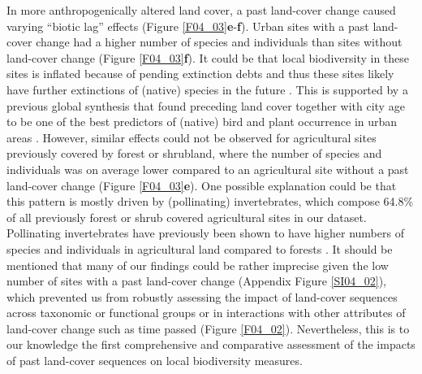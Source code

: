 In more anthropogenically altered land cover, a past land-cover change caused varying “biotic lag” effects (Figure \ref{F04_03}\textbf{e}-\textbf{f}). Urban sites with a past land-cover change had a higher number of species and individuals than sites without land-cover change (Figure \ref{F04_03}\textbf{f}). It could be that local biodiversity in these sites is inflated because of pending extinction debts and thus these sites likely have further extinctions of (native) species in the future \citep{Tilman1994,Kuussaari2009,Hylander2013}. This is supported by a previous global synthesis that found preceding land cover together with city age to be one of the best predictors of (native) bird and plant occurrence in urban areas \citep{Aronson2014}. However, similar effects could not be observed for agricultural sites previously covered by forest or shrubland, where the number of species and individuals was on average lower compared to an agricultural site without a past land-cover change (Figure \ref{F04_03}\textbf{e}). One possible explanation could be that this pattern is mostly driven by (pollinating) invertebrates, which compose 64.8\% of all previously forest or shrub covered agricultural sites in our dataset. Pollinating invertebrates have previously been shown to have higher numbers of species and individuals in agricultural land compared to forests \citep{Winfree2009}. It should be mentioned that many of our findings could be rather imprecise given the low number of sites with a past land-cover change (Appendix Figure \ref{SI04_02}), which prevented us from robustly assessing the impact of land-cover sequences across taxonomic or functional groups \citep{Jung2018} or in interactions with other attributes of land-cover change such as time passed (Figure \ref{F04_02}). Nevertheless, this is to our knowledge the first comprehensive and comparative assessment of the impacts of past land-cover sequences on local biodiversity measures.

